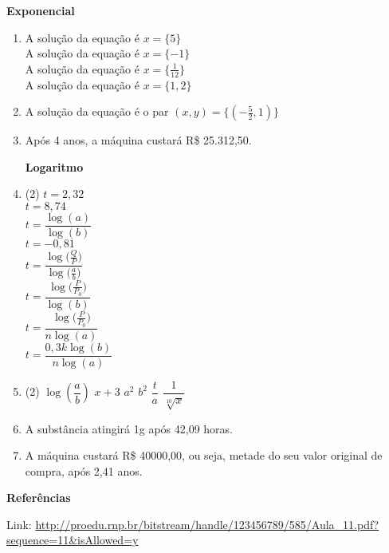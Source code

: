     \noindent
	\textbf{Exponencial}
	\begin{enumerate}
		\item 
		\begin{tasks}
			\task A solução da equação é $x = \{ 5 \} $ \\[-0.25cm]
			\task A solução da equação é $x = \{ -1 \} $ \\[-0.25cm]
			\task A solução da equação é  $x =  \{\frac{1}{12}\} $  \\[-0.25cm]
			\task A solução da equação é  $x =  \{ 1,2 \} $ 
		\end{tasks}
		
		\item A solução da equação é o par $(x,y) =  \{ (-\frac{5}{2}, 1) \} $ 
		
		\item Após 4 anos, a máquina custará R\$ 25.312,50.
		
		\noindent
		\hspace{-1.1cm}\textbf{Logaritmo}
		
		\item 
	
		\begin{tasks}(2)
			\task $ t = 2,32 $ \\[-0.25cm]
			\task $ t = 8,74 $ \\[-0.25cm]
			\task $ t = \dfrac{\log (a)}{\log (b)}$ \\[-0.25cm]
			\task $ t = -0,81 $ \\[-0.25cm]
			\task $ t = \dfrac{\log \big( \frac{Q}{P} \big)}{\log \big(\frac{a}{b}\big)}$ \\[-0.25cm]
			\task $ t = \dfrac{\log \big( \frac{P}{P_0} \big)}{\log (b) }$ \\[-0.25cm]
			\task $ t = \dfrac{\log \big( \frac{P}{P_0} \big)}{n \log (a) }$ \\[-0.25cm]
			\task $ t = \dfrac{0,3k\log (b)}{n\log (a)}$ \\[-0.25cm]
		\end{tasks}
		
		\item 
		
		\begin{tasks}(2)
			\task $\log \left(\dfrac{a}{b}\right)$
			\task $ x+3 $
			\task $ a^2 $
			\task $ b^2 $
			\task $\dfrac{t}{a}$
			\task $ \dfrac{1}{\sqrt[10]{x}}$
		\end{tasks}
		
		\item  A substância atingirá 1g após 42,09 horas.
		
		\item A máquina custará R\$ 40000,00, ou seja, metade do seu valor original de compra, após 2,41 anos.
		
	\end{enumerate}

    \noindent
	\textbf{Referências}

    {\color{green!65!black} \;\Large {}} Link: \url{http://proedu.rnp.br/bitstream/handle/123456789/585/Aula_11.pdf?sequence=11&isAllowed=y}